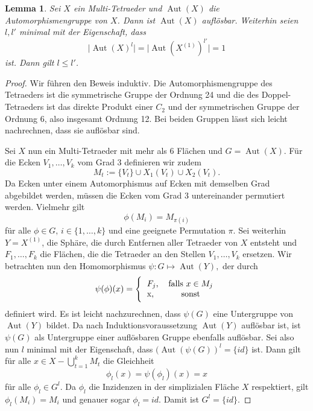 \documentclass[12pt,titlepage,twoside,cleardoublepage]{article}
\theoremstyle{nummermitklammern}
\newtheorem{lemma}[temp]{Lemma}
\newtheorem{lemma}[zahl]{Lemma}
\numberwithin{equation}{section}
\DeclareMathOperator{\Aut}{Aut}
\begin{document}
\begin{lemma}
Sei $X$ ein Multi-Tetraeder und $\Aut(X)$ die Automorphismengruppe von $X$. Dann ist $\Aut(X)$ auflösbar.
Weiterhin seien $l,l'$ minimal mit der Eigenschaft, dass
\[
\vert \Aut(X)^l\vert=\vert \Aut(X^{(1)})^{l'}\vert =1
\] ist. Dann gilt $l\leq l'$.
\end{lemma}
\begin{proof}
Wir führen den Beweis induktiv. Die Automorphismengruppe des Tetraeders ist die symmetrische Gruppe der Ordnung 24 und die des Doppel-Tetraeders ist das direkte Produkt einer $C_2$ und der symmetrischen Gruppe der Ordnung 6, also insgesamt Ordnung 12. Bei beiden Gruppen lässt sich leicht nachrechnen, dass sie auflösbar sind.

Sei $X$ nun ein Multi-Tetraeder mit mehr als  6 Flächen und $G=\Aut(X)$. Für die Ecken $V_1,\ldots,V_k$ vom Grad $3$ definieren wir zudem 
\[
M_t:=\{V_t\} \cup X_1(V_t) \cup X_2(V_t).  
\] 
Da Ecken unter einem Automorphismus auf Ecken mit demselben Grad abgebildet werden, müssen die Ecken vom Grad 3 untereinander permutiert werden. Vielmehr gilt 
\[
\phi(M_i)=M_{\pi(i)} 
\]
für alle $\phi \in G,\,i\in \{1,\ldots,k\}$ und eine geeignete Permutation $\pi.$ Sei weiterhin $Y=X^{(1)}$, die Sphäre, die durch Entfernen aller Tetraeder von $X$ entsteht und $F_1,\ldots,F_k$ die Flächen, die die Tetraeder an den Stellen $V_1,\ldots,V_k$ ersetzen. Wir betrachten nun den Homomorphismus $\psi:G\mapsto \Aut(Y),$ der durch  
\[
\psi(\phi)(x)=\Biggl\{
\begin{tabular}[l]{lcr}
$F_j$,&\textcolor{black}{ falls  $x\in M_j$} \\
x,& sonst\\
\end{tabular}
\]
definiert wird. Es ist leicht nachzurechnen, dass $\psi(G)$ eine Untergruppe von $\Aut(Y)$ bildet. Da nach Induktionsvoraussetzung $\Aut(Y)$ auflösbar ist, ist $\psi(G)$ als Untergruppe einer auflösbaren Gruppe ebenfalls auflösbar. 
Sei also nun $l$ minimal mit der Eigenschaft, dass $(\Aut(\psi(G))^l=\{id\}$ ist. Dann gilt für alle $x\in X-\bigcup_{t=1}^k M_t$ die Gleichheit 
\[
\phi_l(x)=\psi(\phi_l)(x)=x
\] für alle $\phi_l \in G^l$. Da $\phi_l$ die Inzidenzen in der simplizialen Fläche $X$ respektiert, gilt $\phi_l(M_i)=M_i$ und genauer sogar $\phi_l=id.$ Damit ist $G^l =\{id\}$.
  
\end{proof}
\end{document}

